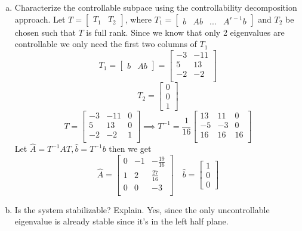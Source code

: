 \documentclass{article}
\begin{document}
\begin{enumerate}[(a)]
\item Characterize the controllable subpace using the controllability decomposition approach.
\newline
\newline
Let $T = \begin{bmatrix} T_1 & T_2 \end{bmatrix}$, where $T_1 = \begin{bmatrix} b & Ab & ... & A^{r-1}b \end{bmatrix}$ and $T_2$ be chosen such that $T$ is full rank.
Since we know that only 2 eigenvalues are controllable we only need the first two columns of $T_1$
$$ T_1 = \begin{bmatrix} b & Ab \end{bmatrix}
=
\begin{bmatrix}
-3 & -11 \\
5 & 13 \\
-2 & -2 \\
\end{bmatrix}
$$
$$ T_2 = \begin{bmatrix} 0 \\ 0 \\ 1 \end{bmatrix} $$
$$
T =
\begin{bmatrix}
-3 & -11 & 0 \\
 5 &  13 & 0 \\
-2 &  -2 & 1 \\
\end{bmatrix}
\implies T^{-1} =
\frac{1}{16}
\begin{bmatrix}
13 & 11 &  0 \\
-5 & -3 &  0 \\
16 & 16 & 16 \\
\end{bmatrix}
$$
Let $\hat{A} = T^{-1}AT, \hat{b} = T^{-1}b$ then we get
$$
\hat{A} =
\begin{bmatrix}
0 & -1 & -\frac{19}{16} \\
1 &  2 &  \frac{27}{16} \\
0 &  0 & -3 \\
\end{bmatrix}
\quad
\hat{b} = \begin{bmatrix} 1 \\ 0 \\ 0 \end{bmatrix}
$$

\item Is the system stabilizable? Explain.
\newline
\newline
Yes, since the only uncontrollable eigenvalue is already stable since it's in the left half plane.


\end{enumerate}
\end{document}
